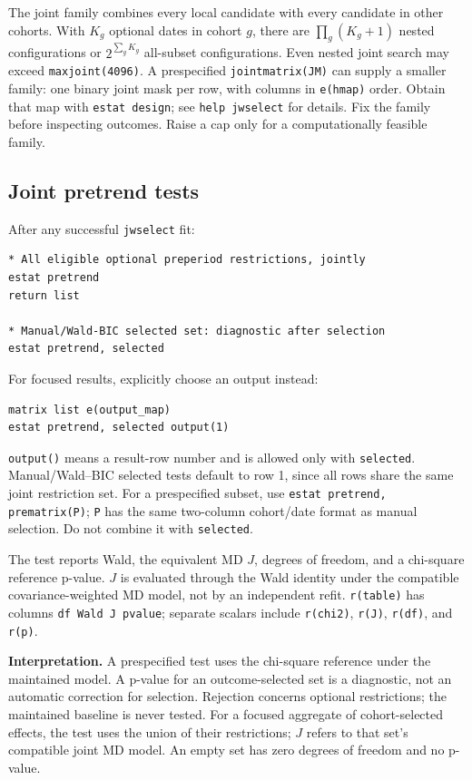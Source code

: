 \documentclass[11pt]{article}
\newcommand{\cmd}[1]{\texttt{#1}}
\begin{document}
The joint family combines every local candidate with every candidate in
other cohorts. With $K_g$ optional dates in cohort $g$, there are
$\prod_g(K_g+1)$ nested configurations or $2^{\sum_g K_g}$ all-subset
configurations. Even nested joint search may exceed \cmd{maxjoint(4096)}.
A prespecified \cmd{jointmatrix(JM)} can supply a smaller family: one binary
joint mask per row, with columns in \cmd{e(hmap)} order. Obtain that map with
\cmd{estat design}; see \cmd{help jwselect} for details. Fix the family before
inspecting outcomes. Raise a cap only for a computationally feasible family.

\subsection*{Joint pretrend tests}
After any successful \cmd{jwselect} fit:
\begin{lstlisting}
* All eligible optional preperiod restrictions, jointly
estat pretrend
return list

* Manual/Wald-BIC selected set: diagnostic after selection
estat pretrend, selected
\end{lstlisting}
For focused results, explicitly choose an output instead:
\begin{lstlisting}
matrix list e(output_map)
estat pretrend, selected output(1)
\end{lstlisting}
\cmd{output()} means a result-row number and is allowed only with
\cmd{selected}. Manual/Wald--BIC selected tests default to row 1, since all
rows share the same joint restriction set. For a prespecified subset, use
\cmd{estat pretrend, prematrix(P)}; \cmd{P} has the same two-column
cohort/date format as manual selection. Do not combine it with \cmd{selected}.

The test reports Wald, the equivalent MD $J$, degrees of freedom, and a
chi-square reference p-value. $J$ is evaluated through the Wald identity
under the compatible covariance-weighted MD model, not by an independent
refit. \cmd{r(table)} has columns \cmd{df Wald J pvalue}; separate scalars
include \cmd{r(chi2)}, \cmd{r(J)}, \cmd{r(df)}, and \cmd{r(p)}.

\enlargethispage{\baselineskip}
\textbf{Interpretation.} A prespecified test uses the chi-square reference
under the maintained model. A p-value for an outcome-selected set is a
diagnostic, not an automatic correction for selection. Rejection concerns
optional restrictions; the maintained baseline is never tested.
For a focused aggregate of cohort-selected effects, the test uses the union
of their restrictions; $J$ refers to that set's compatible joint MD model.
An empty set has zero degrees of freedom and no p-value.
\end{document}
